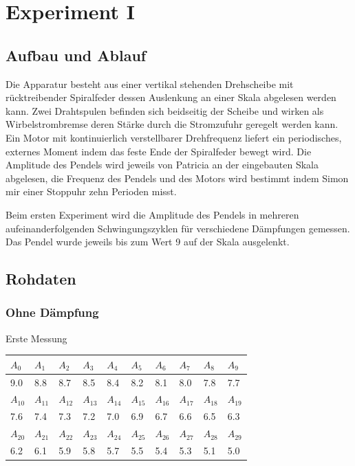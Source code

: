 \documentclass[12pt,a4paper]{article}
\begin{document}
\newpage

\section*{Experiment I}

\subsection*{Aufbau und Ablauf}
Die Apparatur besteht aus einer vertikal stehenden Drehscheibe mit r\"ucktreibender Spiralfeder dessen Auslenkung an einer Skala abgelesen werden kann. Zwei Drahtspulen befinden sich beidseitig der Scheibe und wirken als Wirbelstrombremse deren St\"arke durch die Stromzufuhr geregelt werden kann. Ein Motor mit kontinuierlich verstellbarer Drehfrequenz liefert ein periodisches, externes Moment indem das feste Ende der Spiralfeder bewegt wird. Die Amplitude des Pendels wird jeweils von Patricia an der eingebauten Skala abgelesen, die Frequenz des Pendels und des Motors wird bestimmt indem Simon mir einer Stoppuhr zehn Perioden misst.

Beim ersten Experiment wird die Amplitude des Pendels in mehreren aufeinanderfolgenden Schwingungszyklen f\"ur verschiedene Dämpfungen gemessen. Das Pendel wurde jeweils bis zum Wert 9 auf der Skala ausgelenkt.

\subsection*{Rohdaten}
\subsubsection*{Ohne D\"ampfung}
Erste Messung

\vspace{3pt}
\begin{tabular}{|l|l|l|l|l|l|l|l|l|l|}
\hline
$A_{0}$&$A_{1}$&$A_{2}$&$A_{3}$&$A_{4}$&$A_{5}$&$A_{6}$&$A_{7}$&$A_{8}$&$A_{9}$\\
\hline
9.0&8.8&8.7&8.5&8.4&8.2&8.1&8.0&7.8&7.7\\
\hline
\hline
$A_{10}$&$A_{11}$&$A_{12}$&$A_{13}$&$A_{14}$&$A_{15}$&$A_{16}$&$A_{17}$&$A_{18}$&$A_{19}$\\
\hline
7.6&7.4&7.3&7.2&7.0&6.9&6.7&6.6&6.5&6.3\\
\hline
\hline
$A_{20}$&$A_{21}$&$A_{22}$&$A_{23}$&$A_{24}$&$A_{25}$&$A_{26}$&$A_{27}$&$A_{28}$&$A_{29}$\\
\hline
6.2&6.1&5.9&5.8&5.7&5.5&5.4&5.3&5.1&5.0\\
\hline
\end{tabular}
\end{document}
